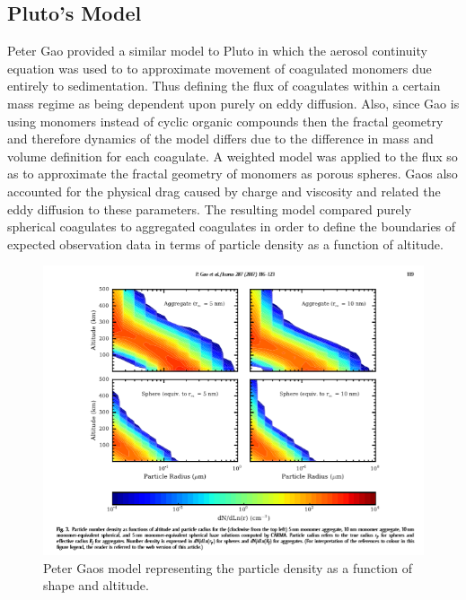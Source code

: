 \documentclass[useAMS,natbib]{mn2e}
\begin{document}
\subsection{Pluto's Model}
Peter Gao provided a similar model to Pluto in which the aerosol continuity equation was used to to approximate movement of coagulated monomers due entirely to sedimentation. Thus defining the flux of coagulates within a certain mass regime as being dependent upon purely on eddy diffusion. Also, since Gao is using monomers instead of cyclic organic compounds then the fractal geometry and therefore dynamics of the model differs due to the difference in mass and volume definition for each coagulate. A weighted model was applied to the flux so as to approximate the fractal geometry of monomers as porous spheres. Gaos also accounted for the physical drag caused by charge and viscosity and related the eddy diffusion to these parameters. The resulting model compared purely spherical coagulates to aggregated coagulates in order to define the boundaries of expected observation data in terms of particle density as a function of altitude.
\begin{figure}
\includegraphics[scale = 0.5]{particle_density_shape}
\caption{Peter Gaos model representing the particle density as a function of shape and altitude.}
\label{part_shape}
\end{figure}
\end{document}
